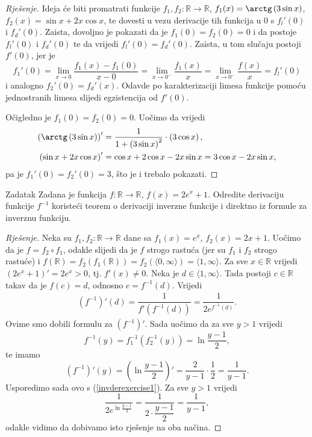 \begin{proof}[Rješenje]
Ideja će biti promatrati funkcije \(f_1, f_2 : \mathbb{R}\to \mathbb{R}\), \(f_1(x)=\arctg\left(3\sin{x}\right)\), \(f_2(x)=\sin{x}+2x\cos{x}\), te dovesti u vezu derivacije tih funkcija u \(0\) s \(f_l'(0)\) i \(f_d'(0)\). Zaista, dovoljno je pokazati da je \(f_1(0)=f_2(0)=0\) i da postoje \(f_l'(0)\) i \(f_d'(0)\) te da vrijedi \(f_l'(0)=f_d'(0)\). Zaista, u tom slučaju postoji \(f'(0)\), jer je
\[f_1'(0)=\lim\limits_{x\to 0}{\dfrac{f_1(x)-f_1(0)}{x-0}}=\lim\limits_{x\to 0^-}{\dfrac{f_1(x)}{x}}=\lim\limits_{x\to 0^-}{\dfrac{f(x)}{x}}=f_l'(0)\]
i analogno \(f_2'(0)=f_d'(x)\). Odavde po karakterizaciji limesa funkcije pomoću jednostranih limesa slijedi egzistencija od \(f'(0)\). 

Očigledno je \(f_1(0)=f_2(0)=0\). Uočimo da vrijedi
\begin{align*}
\left(\arctg\left(3\sin{x}\right)\right)'&=\dfrac{1}{1+\left(3\sin{x}\right)^2}\cdot \left(3\cos{x}\right),\\
\left(\sin{x}+2x\cos{x}\right)'&=\cos{x}+2\cos{x}-2x\sin{x}=3\cos{x}-2x\sin{x},
\end{align*}
pa je \(f_1'(0)=f_2'(0)=3\), što je i trebalo pokazati.
\end{proof}
\begin{exercise}{Zadatak}
Zadana je funkcija \(f : \mathbb{R}\to \mathbb{R}\), \(f(x)=2e^x+1\). Odredite derivaciju funkcije \(f^{-1}\) koristeći teorem o derivaciji inverzne funkcije i direktno iz formule za inverznu funkciju.
\end{exercise}
\begin{proof}[Rješenje]
Neka su \(f_1, f_2 : \mathbb{R}\to \mathbb{R}\) dane sa \(f_1(x)=e^x\), \(f_2(x)=2x+1\). Uočimo da je \(f=f_2\circ f_1\), odakle slijedi da je \(f\) strogo rastuća (jer su \(f_1\) i \(f_2\) strogo rastuće) i \(f(\mathbb{R})=f_2\left(f_1\left(\mathbb{R}\right)\right)=f_2\left(\langle 0, \infty\rangle\right)=\langle 1,\infty\rangle\). Za sve \(x\in \mathbb{R}\) vrijedi \(\left(2e^x+1\right)'=2e^x>0\), tj. \(f'(x)\neq 0\). Neka je \(d\in \langle 1, \infty\rangle\). Tada postoji \(c\in \mathbb{R}\) takav da je \(f(c)=d\), odnosno \(c=f^{-1}(d)\). Vrijedi
\begin{align}
\label{invderexercise1}
\left(f^{-1}\right)'(d)=\dfrac{1}{f'\left(f^{-1}(d)\right)}=\dfrac{1}{2e^{f^{-1}(d)}}.
\end{align}
Ovime smo dobili formulu za \(\left(f^{-1}\right)'\). Sada uočimo da za sve \(y>1\) vrijedi
\[f^{-1}(y)=f_1^{-1}\left(f_2^{-1}\left(y\right)\right)=\ln{\dfrac{y-1}{2}},\]
te imamo
\[\left(f^{-1}\right)'(y)=\left(\ln{\dfrac{y-1}{2}}\right)'=\dfrac{2}{y-1}\cdot \dfrac{1}{2}=\dfrac{1}{y-1}.\]
Usporedimo sada ovo s (\ref{invderexercise1}). Za sve \(y>1\) vrijedi
\[\dfrac{1}{2e^{\ln{\frac{y-1}{2}}}}=\dfrac{1}{2\cdot \dfrac{y-1}{2}}=\dfrac{1}{y-1},\]
odakle vidimo da dobivamo isto rješenje na oba načina.
\end{proof}
